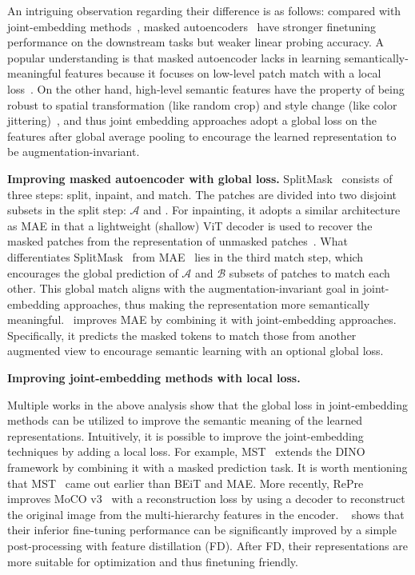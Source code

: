 \documentclass[10pt,journal,compsoc]{IEEEtran}
\begin{document}
An intriguing observation regarding their difference is as follows: compared with joint-embedding methods~\cite{chen2021mocov3,caron2021emerging}, masked autoencoders~\cite{he2022masked,xie2022simmim} have stronger finetuning performance on the downstream tasks but weaker linear probing accuracy. A popular understanding is that masked autoencoder lacks in learning semantically-meaningful features because it focuses on low-level patch match with a local loss~\cite{he2022masked,xie2022simmim}. On the other hand, high-level semantic features have the property of being robust to spatial transformation (like random crop) and style change (like color jittering)~\cite{misra2020self}, and thus joint embedding approaches adopt a global loss on the features after global average pooling to encourage the learned representation to be augmentation-invariant. 



\textbf{Improving masked autoencoder with global loss.} SplitMask~\cite{el2021large} consists of three steps: split, inpaint, and match. The patches are divided into two disjoint subsets in the split step: $\mathcal{A}$ and $\mathcal {} $. For inpainting, it adopts a similar architecture as MAE in that a lightweight (shallow) ViT decoder is used to recover the masked patches from the representation of unmasked patches~\cite{el2021large}. What differentiates SplitMask~\cite{el2021large} from MAE~\cite{he2022masked} lies in the third match step, which encourages the global prediction of $\mathcal{A}$ and $\mathcal{B}$ subsets of patches to match each other. This global match aligns with the augmentation-invariant goal in joint-embedding approaches, thus making the representation more semantically meaningful.~\cite{tao2022siamese} improves MAE by combining it with joint-embedding approaches. Specifically, it predicts the masked tokens to match those from another augmented view to encourage semantic learning with an optional global loss.  



\textbf{Improving joint-embedding methods with local loss.}

Multiple works in the above analysis show that the global loss in joint-embedding methods can be utilized to improve the semantic meaning of the learned representations. Intuitively, it is possible to improve the joint-embedding techniques by adding a local loss. For example, MST~\cite{li2021mst} extends the DINO framework by combining it with a masked prediction task. It is worth mentioning that MST~\cite{li2021mst} came out earlier than BEiT and MAE. More recently, RePre~\cite{wang2022repre} improves MoCO v3~\cite{chen2021mocov3} with a reconstruction loss by using a decoder to reconstruct the original image from the multi-hierarchy features in the encoder. ~\cite{wei2022contrastive} shows that their inferior fine-tuning performance can be significantly improved by a simple post-processing with feature distillation (FD). After FD, their representations are more suitable for optimization and thus finetuning friendly. 
\end{document}
